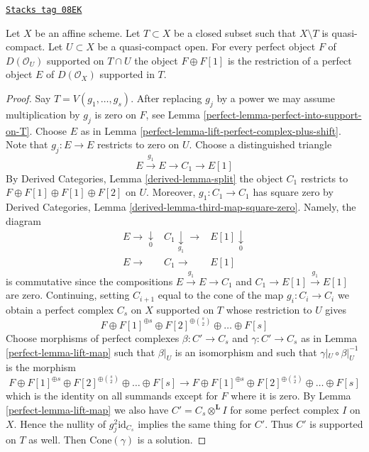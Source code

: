 \begin{lemma}
\label{perfect-lemma-lift-perfect-complex-plus-shift-support}
\href{https://stacks.math.columbia.edu/tag/08EK}{\texttt{Stacks tag 08EK}}

Let $X$ be an affine scheme. Let $T \subset X$ be a closed subset
such that $X \setminus T$ is quasi-compact. Let $U \subset X$ be a
quasi-compact open. For every perfect object $F$ of $D(\mathcal{O}_U)$
supported on $T \cap U$ the object $F \oplus F[1]$ is the restriction of
a perfect object $E$ of $D(\mathcal{O}_X)$ supported in $T$.
\end{lemma}

\begin{proof}

Say $T = V(g_1, \ldots, g_s)$. After replacing $g_j$ by a power we
may assume multiplication by $g_j$ is zero on $F$, see
Lemma \ref{perfect-lemma-perfect-into-support-on-T}. Choose $E$ as in
Lemma \ref{perfect-lemma-lift-perfect-complex-plus-shift}.
Note that $g_j : E \to E$ restricts to zero on $U$.
Choose a distinguished triangle
$$
E \xrightarrow{g_1} E \to C_1 \to E[1]
$$
By Derived Categories, Lemma \ref{derived-lemma-split}
the object $C_1$ restricts to
$F \oplus F[1] \oplus F[1] \oplus F[2]$ on $U$.
Moreover, $g_1 : C_1 \to C_1$ has square zero by
Derived Categories, Lemma \ref{derived-lemma-third-map-square-zero}.
Namely, the diagram
$$
\begin{array}{ccc}E \longrightarrow\underset{0}{\downarrow} & C_1 \underset{g_1}{\downarrow}\longrightarrow & E[1] \underset{0}{\downarrow} \\ E \longrightarrow & C_1 \longrightarrow & E[1]\end{array}
$$
is commutative since the compositions $E \xrightarrow{g_1} E \to C_1$ and
$C_1 \to E[1] \xrightarrow{g_1} E[1]$ are zero. Continuing, setting
$C_{i + 1}$ equal to the cone of the map $g_i : C_i \to C_i$ we obtain
a perfect complex $C_s$ on $X$ supported on $T$
whose restriction to $U$ gives
$$
F \oplus F[1]^{\oplus s} \oplus F[2]^{\oplus {s \choose 2}}
\oplus \ldots \oplus F[s]
$$
Choose morphisms of perfect complexes $\beta : C' \to C_s$
and $\gamma : C' \to C_s$ as in Lemma \ref{perfect-lemma-lift-map}
such that $\beta|_U$ is an isomorphism and such that
$\gamma|_U \circ \beta|_U^{-1}$ is the morphism
$$
F \oplus F[1]^{\oplus s} \oplus F[2]^{\oplus {s \choose 2}}
\oplus \ldots \oplus F[s]
\to
F \oplus F[1]^{\oplus s} \oplus F[2]^{\oplus {s \choose 2}}
\oplus \ldots \oplus F[s]
$$
which is the identity on all summands except for $F$ where it is zero.
By Lemma \ref{perfect-lemma-lift-map} we also have
$C' = C_s \otimes^\mathbf{L} I$ for some perfect complex
$I$ on $X$. Hence the nullity of $g_j^2\text{id}_{C_s}$ implies the
same thing for $C'$. Thus $C'$ is supported on $T$ as well.
Then $\text{Cone}(\gamma)$ is a solution.
\end{proof}


